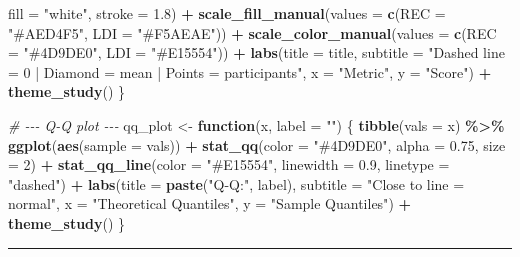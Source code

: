 \documentclass[
]{article}
\newenvironment{Shaded}{\begin{snugshade}}{\end{snugshade}}
\newcommand{\AttributeTok}[1]{\textcolor[rgb]{0.13,0.29,0.53}{#1}}
\newcommand{\CommentTok}[1]{\textcolor[rgb]{0.56,0.35,0.01}{\textit{#1}}}
\newcommand{\ControlFlowTok}[1]{\textcolor[rgb]{0.13,0.29,0.53}{\textbf{#1}}}
\newcommand{\DecValTok}[1]{\textcolor[rgb]{0.00,0.00,0.81}{#1}}
\newcommand{\FloatTok}[1]{\textcolor[rgb]{0.00,0.00,0.81}{#1}}
\newcommand{\FunctionTok}[1]{\textcolor[rgb]{0.13,0.29,0.53}{\textbf{#1}}}
\newcommand{\NormalTok}[1]{#1}
\newcommand{\OtherTok}[1]{\textcolor[rgb]{0.56,0.35,0.01}{#1}}
\newcommand{\SpecialCharTok}[1]{\textcolor[rgb]{0.81,0.36,0.00}{\textbf{#1}}}
\newcommand{\StringTok}[1]{\textcolor[rgb]{0.31,0.60,0.02}{#1}}
\begin{document}
\begin{Shaded}
\begin{Highlighting}[]
                 \AttributeTok{fill =} \StringTok{"white"}\NormalTok{, }\AttributeTok{stroke =} \FloatTok{1.8}\NormalTok{) }\SpecialCharTok{+}
    \FunctionTok{scale\_fill\_manual}\NormalTok{(}\AttributeTok{values  =} \FunctionTok{c}\NormalTok{(}\AttributeTok{REC =} \StringTok{"\#AED4F5"}\NormalTok{, }\AttributeTok{LDI =} \StringTok{"\#F5AEAE"}\NormalTok{)) }\SpecialCharTok{+}
    \FunctionTok{scale\_color\_manual}\NormalTok{(}\AttributeTok{values =} \FunctionTok{c}\NormalTok{(}\AttributeTok{REC =} \StringTok{"\#4D9DE0"}\NormalTok{, }\AttributeTok{LDI =} \StringTok{"\#E15554"}\NormalTok{)) }\SpecialCharTok{+}
    \FunctionTok{labs}\NormalTok{(}\AttributeTok{title    =}\NormalTok{ title,}
         \AttributeTok{subtitle =} \StringTok{"Dashed line = 0 | Diamond = mean | Points = participants"}\NormalTok{,}
         \AttributeTok{x =} \StringTok{"Metric"}\NormalTok{, }\AttributeTok{y =} \StringTok{"Score"}\NormalTok{) }\SpecialCharTok{+}
    \FunctionTok{theme\_study}\NormalTok{()}
\NormalTok{\}}

\CommentTok{\# {-}{-}{-} Q{-}Q plot {-}{-}{-}}
\NormalTok{qq\_plot }\OtherTok{\textless{}{-}} \ControlFlowTok{function}\NormalTok{(x, }\AttributeTok{label =} \StringTok{""}\NormalTok{) \{}
  \FunctionTok{tibble}\NormalTok{(}\AttributeTok{vals =}\NormalTok{ x) }\SpecialCharTok{\%\textgreater{}\%}
    \FunctionTok{ggplot}\NormalTok{(}\FunctionTok{aes}\NormalTok{(}\AttributeTok{sample =}\NormalTok{ vals)) }\SpecialCharTok{+}
    \FunctionTok{stat\_qq}\NormalTok{(}\AttributeTok{color =} \StringTok{"\#4D9DE0"}\NormalTok{, }\AttributeTok{alpha =} \FloatTok{0.75}\NormalTok{, }\AttributeTok{size =} \DecValTok{2}\NormalTok{) }\SpecialCharTok{+}
    \FunctionTok{stat\_qq\_line}\NormalTok{(}\AttributeTok{color =} \StringTok{"\#E15554"}\NormalTok{, }\AttributeTok{linewidth =} \FloatTok{0.9}\NormalTok{, }\AttributeTok{linetype =} \StringTok{"dashed"}\NormalTok{) }\SpecialCharTok{+}
    \FunctionTok{labs}\NormalTok{(}\AttributeTok{title =} \FunctionTok{paste}\NormalTok{(}\StringTok{"Q{-}Q:"}\NormalTok{, label), }\AttributeTok{subtitle =} \StringTok{"Close to line = normal"}\NormalTok{,}
         \AttributeTok{x =} \StringTok{"Theoretical Quantiles"}\NormalTok{, }\AttributeTok{y =} \StringTok{"Sample Quantiles"}\NormalTok{) }\SpecialCharTok{+}
    \FunctionTok{theme\_study}\NormalTok{()}
\NormalTok{\}}
\end{Highlighting}
\end{Shaded}

\begin{center}\rule{0.5\linewidth}{0.5pt}\end{center}
\end{document}
